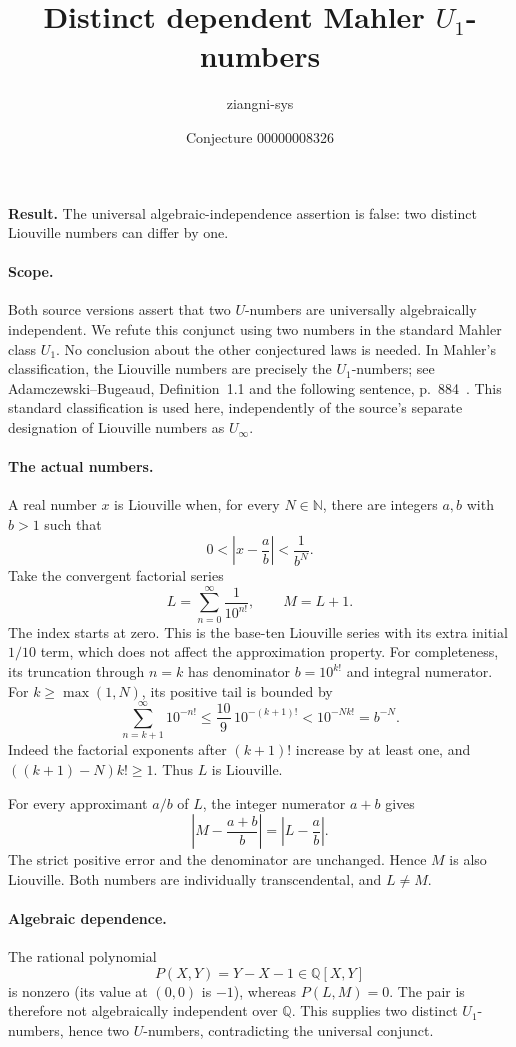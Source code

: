 \documentclass[11pt]{article}
\title{Distinct dependent Mahler $U_1$-numbers}
\author{ziangni-sys}
\date{Conjecture 00000008326}
\begin{document}
\raggedright
\maketitle
\noindent\textbf{Result.} The universal algebraic-independence assertion is false: two distinct Liouville numbers can differ by one.

\paragraph{Scope.}
Both source versions assert that two $U$-numbers are universally algebraically independent. We refute this conjunct using two numbers in the standard Mahler class $U_1$. No conclusion about the other conjectured laws is needed. In Mahler's classification, the Liouville numbers are precisely the $U_1$-numbers; see Adamczewski--Bugeaud, Definition~1.1 and the following sentence, p.~884~\cite{AB}. This standard classification is used here, independently of the source's separate designation of Liouville numbers as $U_\infty$.

\paragraph{The actual numbers.}
A real number $x$ is Liouville when, for every $N\in\mathbb N$, there are integers $a,b$ with $b>1$ such that
\[
0<\left|x-\frac ab\right|<\frac1{b^N}.
\]
Take the convergent factorial series
\[
L=\sum_{n=0}^{\infty}\frac1{10^{n!}},\qquad M=L+1.
\]
The index starts at zero. This is the base-ten Liouville series with its extra initial $1/10$ term, which does not affect the approximation property. For completeness, its truncation through $n=k$ has denominator $b=10^{k!}$ and integral numerator. For $k\geq\max(1,N)$, its positive tail is bounded by
\[
\sum_{n=k+1}^{\infty}10^{-n!}
\leq \frac{10}{9}\,10^{-(k+1)!}
<10^{-Nk!}=b^{-N}.
\]
Indeed the factorial exponents after $(k+1)!$ increase by at least one, and $((k+1)-N)k!\geq1$. Thus $L$ is Liouville.

For every approximant $a/b$ of $L$, the integer numerator $a+b$ gives
\[
\left|M-\frac{a+b}{b}\right|=
\left|L-\frac ab\right|.
\]
The strict positive error and the denominator are unchanged. Hence $M$ is also Liouville. Both numbers are individually transcendental, and $L\ne M$.

\paragraph{Algebraic dependence.}
The rational polynomial
\[
P(X,Y)=Y-X-1\in\mathbb Q[X,Y]
\]
is nonzero (its value at $(0,0)$ is $-1$), whereas $P(L,M)=0$. The pair is therefore not algebraically independent over $\mathbb Q$. This supplies two distinct $U_1$-numbers, hence two $U$-numbers, contradicting the universal conjunct.
\end{document}
